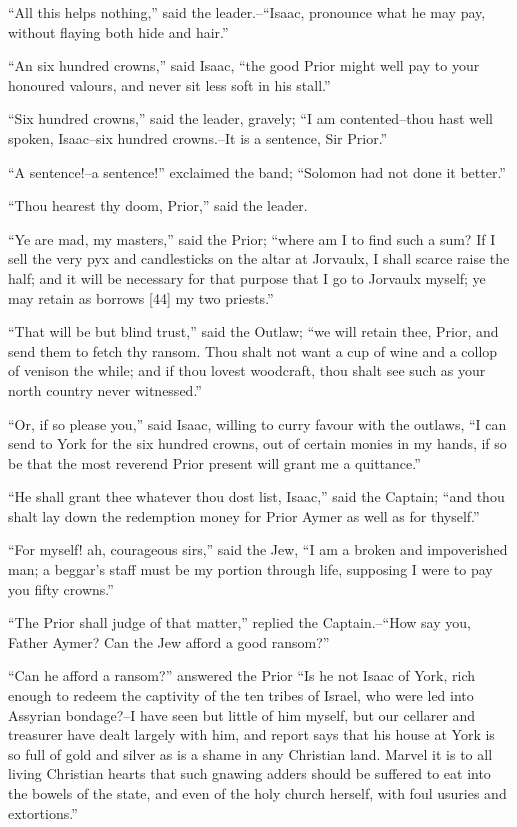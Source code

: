 ``All this helps nothing,'' said the leader.--``Isaac, pronounce what he
may pay, without flaying both hide and hair.''

``An six hundred crowns,'' said Isaac, ``the good Prior might well pay
to your honoured valours, and never sit less soft in his stall.''

``Six hundred crowns,'' said the leader, gravely; ``I am contented--thou
hast well spoken, Isaac--six hundred crowns.--It is a sentence, Sir
Prior.''

``A sentence!--a sentence!'' exclaimed the band; ``Solomon had not done
it better.''

``Thou hearest thy doom, Prior,'' said the leader.

``Ye are mad, my masters,'' said the Prior; ``where am I to find such a
sum? If I sell the very pyx and candlesticks on the altar at Jorvaulx, I
shall scarce raise the half; and it will be necessary for that purpose
that I go to Jorvaulx myself; ye may retain as borrows {[}44{]} my two
priests.''

``That will be but blind trust,'' said the Outlaw; ``we will retain
thee, Prior, and send them to fetch thy ransom. Thou shalt not want a
cup of wine and a collop of venison the while; and if thou lovest
woodcraft, thou shalt see such as your north country never witnessed.''

``Or, if so please you,'' said Isaac, willing to curry favour with the
outlaws, ``I can send to York for the six hundred crowns, out of certain
monies in my hands, if so be that the most reverend Prior present will
grant me a quittance.''

``He shall grant thee whatever thou dost list, Isaac,'' said the
Captain; ``and thou shalt lay down the redemption money for Prior Aymer
as well as for thyself.''

``For myself! ah, courageous sirs,'' said the Jew, ``I am a broken and
impoverished man; a beggar's staff must be my portion through life,
supposing I were to pay you fifty crowns.''

``The Prior shall judge of that matter,'' replied the Captain.--``How
say you, Father Aymer? Can the Jew afford a good ransom?''

``Can he afford a ransom?'' answered the Prior ``Is he not Isaac of
York, rich enough to redeem the captivity of the ten tribes of Israel,
who were led into Assyrian bondage?--I have seen but little of him
myself, but our cellarer and treasurer have dealt largely with him, and
report says that his house at York is so full of gold and silver as is a
shame in any Christian land. Marvel it is to all living Christian hearts
that such gnawing adders should be suffered to eat into the bowels of
the state, and even of the holy church herself, with foul usuries and
extortions.''

